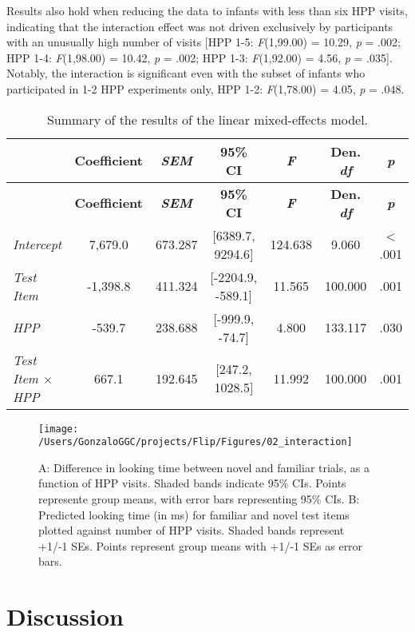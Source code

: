 \documentclass[english,man,man,floatsintext]{apa6}
\begin{document}
Results also hold when reducing the data to infants with less than six HPP visits, indicating that the interaction effect was not driven exclusively by participants with an unusually high number of visits {[}HPP 1-5: \emph{F}(1,99.00) = 10.29, \emph{p} = .002; HPP 1-4: \emph{F}(1,98.00) = 10.42, \emph{p} = .002; HPP 1-3: \emph{F}(1,92.00) = 4.56, \emph{p} = .035{]}. Notably, the interaction is significant even with the subset of infants who participated in 1-2 HPP experiments only, HPP 1-2: \emph{F}(1,78.00) = 4.05, \emph{p} = .048.

\begin{longtable}[]{@{}lcccccc@{}}
\caption{\label{tab:tab1}Summary of the results of the linear mixed-effects model.}\tabularnewline
\toprule
& \textbf{Coefficient} & \textbf{\emph{SEM}} & \textbf{95\% CI} & \textbf{\emph{F}} & \textbf{Den. \emph{df}} & \textbf{\emph{p}}\tabularnewline
\midrule
\endfirsthead
\toprule
& \textbf{Coefficient} & \textbf{\emph{SEM}} & \textbf{95\% CI} & \textbf{\emph{F}} & \textbf{Den. \emph{df}} & \textbf{\emph{p}}\tabularnewline
\midrule
\endhead
\emph{Intercept} & 7,679.0 & 673.287 & {[}6389.7, 9294.6{]} & 124.638 & 9.060 & \textless{} .001\tabularnewline
\emph{Test Item} & -1,398.8 & 411.324 & {[}-2204.9, -589.1{]} & 11.565 & 100.000 & .001\tabularnewline
\emph{HPP} & -539.7 & 238.688 & {[}-999.9, -74.7{]} & 4.800 & 133.117 & .030\tabularnewline
\emph{Test Item \(\times\) HPP} & 667.1 & 192.645 & {[}247.2, 1028.5{]} & 11.992 & 100.000 & .001\tabularnewline
\bottomrule
\end{longtable}

\begin{figure}
\texttt{[image: /Users/GonzaloGGC/projects/Flip/Figures/02\_interaction]} \caption{A: Difference in looking time between novel and familiar trials, as a function of HPP visits. Shaded bands indicate 95\% CIs. Points represente group means, with error bars representing 95\% CIs. B: Predicted looking time (in ms) for familiar and novel test items plotted against number of HPP visits. Shaded bands represent +1/-1 SEs. Points represent group means with +1/-1 SEs as error bars.}\label{fig:fig2}
\end{figure}

\hypertarget{discussion}{%
\section{Discussion}\label{discussion}}
\end{document}

